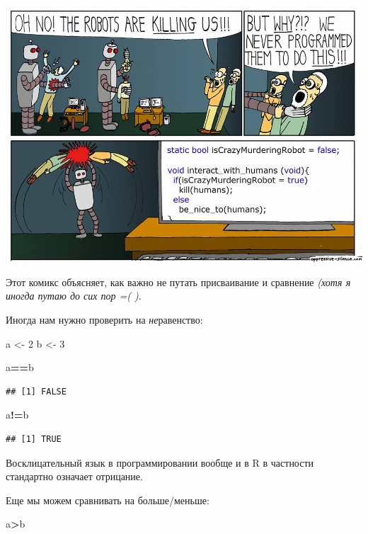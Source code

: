 \documentclass[]{book}
\newenvironment{Shaded}{\begin{snugshade}}{\end{snugshade}}
\newcommand{\DecValTok}[1]{\textcolor[rgb]{0.00,0.00,0.81}{#1}}
\newcommand{\NormalTok}[1]{#1}
\newcommand{\OperatorTok}[1]{\textcolor[rgb]{0.81,0.36,0.00}{\textbf{#1}}}
\newcommand{\StringTok}[1]{\textcolor[rgb]{0.31,0.60,0.02}{#1}}
\begin{document}
\includegraphics{images/WaCM5x3mvQM.jpg}

Этот комикс объясняет, как важно не путать присваивание и сравнение \emph{(хотя я иногда путаю до сих пор =( )}.

Иногда нам нужно проверить на \emph{не}равенство:

\begin{Shaded}
\begin{Highlighting}[]
\NormalTok{a <-}\StringTok{ }\DecValTok{2}
\NormalTok{b <-}\StringTok{ }\DecValTok{3}

\NormalTok{a}\OperatorTok{==}\NormalTok{b}
\end{Highlighting}
\end{Shaded}

\begin{verbatim}
## [1] FALSE
\end{verbatim}

\begin{Shaded}
\begin{Highlighting}[]
\NormalTok{a}\OperatorTok{!=}\NormalTok{b}
\end{Highlighting}
\end{Shaded}

\begin{verbatim}
## [1] TRUE
\end{verbatim}

Восклицательный язык в программировании вообще и в R в частности стандартно означает отрицание.

Еще мы можем сравнивать на больше/меньше:

\begin{Shaded}
\begin{Highlighting}[]
\NormalTok{a}\OperatorTok{>}\NormalTok{b}
\end{Highlighting}
\end{Shaded}
\end{document}
